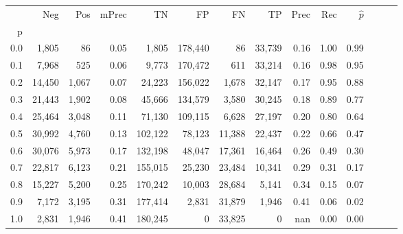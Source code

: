 \begin{tabular}{rrrrrrrrrrrrrr}
\toprule
{} &     Neg &    Pos & mPrec &       TN &       FP &      FN &      TP &  Prec &   Rec & $\hat{p}$ \\
p   &         &        &       &          &          &         &         &       &       &           \\
\midrule
0.0 &   1,805 &     86 &  0.05 &    1,805 &  178,440 &      86 &  33,739 &  0.16 &  1.00 &      0.99 \\
0.1 &   7,968 &    525 &  0.06 &    9,773 &  170,472 &     611 &  33,214 &  0.16 &  0.98 &      0.95 \\
0.2 &  14,450 &  1,067 &  0.07 &   24,223 &  156,022 &   1,678 &  32,147 &  0.17 &  0.95 &      0.88 \\
0.3 &  21,443 &  1,902 &  0.08 &   45,666 &  134,579 &   3,580 &  30,245 &  0.18 &  0.89 &      0.77 \\
0.4 &  25,464 &  3,048 &  0.11 &   71,130 &  109,115 &   6,628 &  27,197 &  0.20 &  0.80 &      0.64 \\
0.5 &  30,992 &  4,760 &  0.13 &  102,122 &   78,123 &  11,388 &  22,437 &  0.22 &  0.66 &      0.47 \\
0.6 &  30,076 &  5,973 &  0.17 &  132,198 &   48,047 &  17,361 &  16,464 &  0.26 &  0.49 &      0.30 \\
0.7 &  22,817 &  6,123 &  0.21 &  155,015 &   25,230 &  23,484 &  10,341 &  0.29 &  0.31 &      0.17 \\
0.8 &  15,227 &  5,200 &  0.25 &  170,242 &   10,003 &  28,684 &   5,141 &  0.34 &  0.15 &      0.07 \\
0.9 &   7,172 &  3,195 &  0.31 &  177,414 &    2,831 &  31,879 &   1,946 &  0.41 &  0.06 &      0.02 \\
1.0 &   2,831 &  1,946 &  0.41 &  180,245 &        0 &  33,825 &       0 &   nan &  0.00 &      0.00 \\
\bottomrule
\end{tabular}
